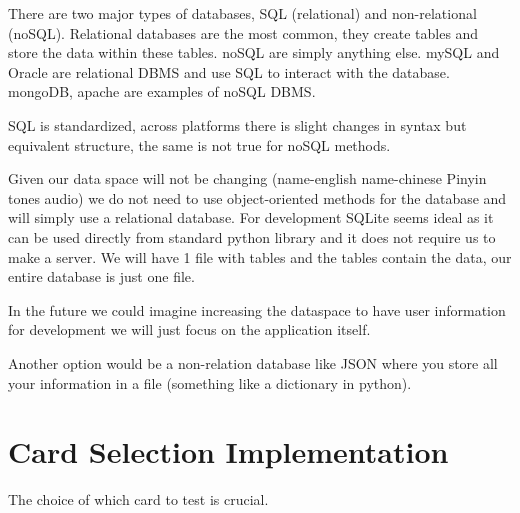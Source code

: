 \documentclass{article}
\begin{document}
There are two major types of databases, SQL (relational) and non-relational
(noSQL).
Relational databases are the most common, they create tables and store the
data within these tables.
noSQL are simply anything else.
mySQL and Oracle are relational DBMS and use SQL to interact with the database.
mongoDB, apache are examples of noSQL DBMS.

SQL is standardized, across platforms there is slight changes in syntax but
equivalent structure, the same is not true for noSQL methods.

Given our data space will not be changing (name-english name-chinese Pinyin
tones audio) we do not need to use object-oriented methods for the database and will
simply use a relational database.
For development SQLite seems ideal as it can be used directly from standard
python library and it does not require us to make a server.
We will have 1 file with tables and the tables contain the data, our entire
database is just one file.

In the future we could imagine increasing the dataspace to have user information
for development we will just focus on the application itself.

Another option would be a non-relation database like JSON where you store
all your information in a file (something like a dictionary in python).


\section*{Card Selection Implementation}
The choice of which card to test is crucial.
\end{document}
